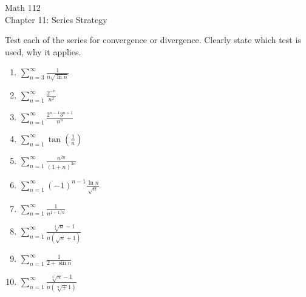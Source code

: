 \documentclass[11pt]{article}
\begin{document}
\begin{center}
\Large
\rm{Math 112}
\\
\rm{Chapter 11:  Series Strategy}
\\
\vspace{0.2in}

\end{center}

Test each of the series for convergence or divergence.  Clearly state which test is used, why it applies.
  \begin{enumerate}

  \item{ $\sum_{n=3}^{\infty} \frac{1}{n\sqrt{\ln{n}}}$}

    \vspace{0.8in}
    
  \item{ $\sum_{n=1}^{\infty} \frac{2^{-n}}{n^2}$}

    \vspace{0.8in}
    
  \item{ $\sum_{n=1}^{\infty} \frac{2^{n-1}3^{n+1}}{n^n}$}

    \vspace{0.8in}
    

  \item{ $\sum_{n=1}^{\infty} \tan{\left(\frac{1}{n}\right)}$}

    \vspace{0.8in}

    

  \item{ $\sum_{n=1}^{\infty} \frac{n^{2n}}{(1+n)^{3n}}$}


    
    \pagebreak

    \vspace{0.8in}
    
  \item{ $\sum_{n=1}^{\infty} (-1)^{n-1}\frac{\ln{n}}{\sqrt{n}}$}

        \vspace{1.2in}
    

  \item{ $\sum_{n=1}^{\infty} \frac{1}{n^{1+1/n}}$}

        \vspace{1.2in}
    

  \item{ $\sum_{n=1}^{\infty} \frac{\sqrt[3]{n}-1}{n(\sqrt{n}+1)}$}

            \vspace{1.2in}
    

  \item{ $\sum_{n=1}^{\infty} \frac{1}{2+\sin{n}}$}

            \vspace{1.2in}
    

  \item{ $\sum_{n=1}^{\infty} \frac{\sqrt[3]{n}-1}{n(\sqrt[n]+1)}$}

    
    

      \end{enumerate}
\end{document}
